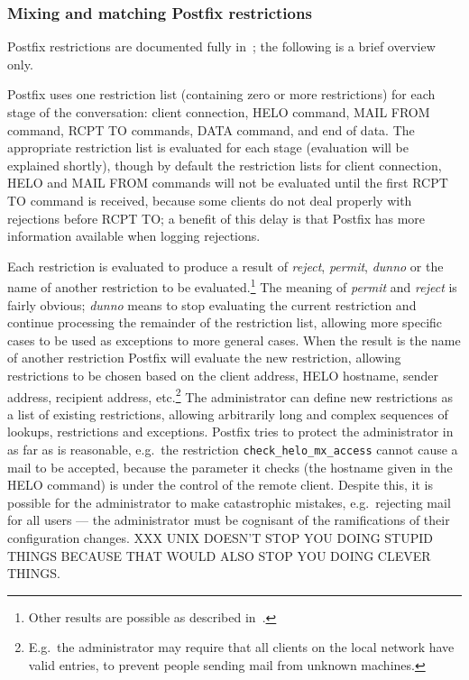 \subsubsection{Mixing and matching Postfix restrictions}

\label{Mixing and matching Postfix restrictions}

Postfix restrictions are documented fully in~\cite{smtpd_access_readme,
smtpd_per_user_control, policy-servers}; the following is a brief overview
only.

Postfix uses one restriction list (containing zero or more restrictions)
for each stage of the \SMTP{} conversation: client connection, HELO
command, MAIL FROM command, RCPT TO commands, DATA command, and end of
data.  The appropriate restriction list is evaluated for each stage
(evaluation will be explained shortly), though by default the restriction
lists for client connection, HELO and MAIL FROM commands will not be
evaluated until the first RCPT TO command is received, because some clients
do not deal properly with rejections before RCPT TO\@; a benefit of this
delay is that Postfix has more information available when logging
rejections.

Each restriction is evaluated to produce a result of \textit{reject},
\textit{permit}, \textit{dunno\/} or the name of another restriction to be
evaluated.\footnote{Other results are possible as described
in~\cite{smtpd_access_readme, smtpd_per_user_control, policy-servers}.} The
meaning of \textit{permit\/} and \textit{reject\/} is fairly obvious;
\textit{dunno\/} means to stop evaluating the current restriction and
continue processing the remainder of the restriction list, allowing more
specific cases to be used as exceptions to more general cases.  When the
result is the name of another restriction Postfix will evaluate the new
restriction, allowing restrictions to be chosen based on the client \IP{}
address, HELO hostname, sender address, recipient address,
etc.\footnote{E.g.\ the administrator may require that all clients on the
local network have valid \DNS{} entries, to prevent people sending mail
from unknown machines.}  The administrator can define new restrictions as a
list of existing restrictions, allowing arbitrarily long and complex
sequences of lookups, restrictions and exceptions.  Postfix tries to
protect the administrator in as far as is reasonable, e.g.\ the restriction
\texttt{check\_helo\_mx\_access} cannot cause a mail to be accepted,
because the parameter it checks (the hostname given in the HELO command) is
under the control of the remote client.  Despite this, it is possible for
the administrator to make catastrophic mistakes, e.g.\ rejecting mail for
all users --- the administrator must be cognisant of the ramifications of
their configuration changes.  XXX UNIX DOESN'T STOP YOU DOING STUPID THINGS
BECAUSE THAT WOULD ALSO STOP YOU DOING CLEVER THINGS\@.

